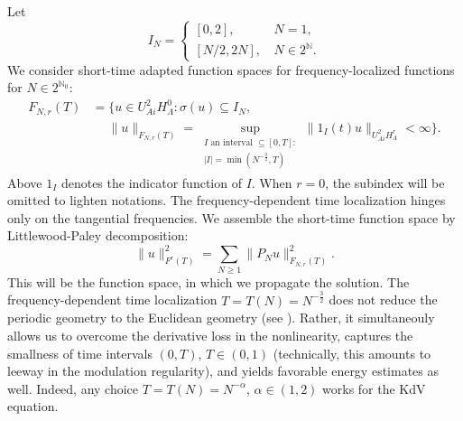 \documentclass{amsart}
\theoremstyle{definition}
\newcommand{\N}{\mathbb{N}}
\begin{document}
Let
\begin{equation*}
I_N =
\begin{cases}
[0,2], \, &N =1, \\
[N/2,2N], \, &N \in 2^{\N}.
\end{cases}
\end{equation*}
We consider short-time adapted function spaces for frequency-localized functions for $N \in 2^{\N_0}$:
\begin{equation*}
\begin{split}
F_{N,r}(T) &= \{ u \in U^2_{Ai} H^0_{\Lambda} : \sigma( u) \subseteq I_N,  \\ 
&\quad \; \| u \|_{F_{N,r}(T)} = \sup_{\substack{I \text{ an interval } \subseteq [0,T]: \\ |I| = \min( N^{-\frac{3}{2}}, T)}} \| 1_{I}(t) u \|_{U^2_{Ai} H^r_{\Lambda}} < \infty \}.
\end{split}
\end{equation*}
Above $1_I$ denotes the indicator function of $I$. When $r=0$, the subindex will be omitted to lighten notations.
The frequency-dependent time localization hinges only on the tangential frequencies. We assemble the short-time function space by Littlewood-Paley decomposition:
\begin{equation*}
\| u \|^2_{F^{r}(T)} = \sum_{N \geq 1} \| P_N u \|^2_{F_{N,r}(T)}.
\end{equation*}
This will be the function space, in which we propagate the solution.
The frequency-dependent time localization $T=T(N)= N^{-\frac{3}{2}}$ does not reduce the periodic geometry to the Euclidean geometry (see \cite[Chapter~3]{ShorttimeFourierTransformRestriction}). Rather, it simultaneouly allows us to overcome the derivative loss in the nonlinearity, captures the smallness of time intervals $(0,T)$, $T \in (0,1)$ (technically, this amounts to leeway in the modulation regularity), and yields favorable energy estimates as well. Indeed, any choice $T=T(N)=N^{-\alpha}$, $\alpha \in (1,2)$ works for the KdV equation.
\end{document}
